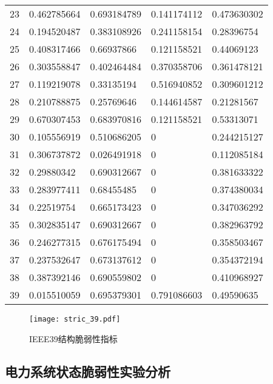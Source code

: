 \begin{table}[H]
\begin{tabular}{C{1.5cm}C{2.75cm}C{2.75cm}C{3.25cm}C{2.75cm}}
  23 & 0.462785664 & 0.693184789 & 0.141174112 & 0.473630302 \\ 
  24 & 0.194520487 & 0.383108926 & 0.241158154 & 0.28396754 \\ 
  25 & 0.408317466 & 0.66937866 & 0.121158521 & 0.44069123 \\ 
  26 & 0.303558847 & 0.402464484 & 0.370358706 & 0.361478121 \\ 
  27 & 0.119219078 & 0.33135194 & 0.516940852 & 0.309601212 \\ 
  28 & 0.210788875 & 0.25769646 & 0.144614587 & 0.21281567 \\ 
  29 & 0.670307453 & 0.683970816 & 0.121158521 & 0.53313071 \\ 
  30 & 0.105556919 & 0.510686205 & 0 & 0.244215127 \\ 
  31 & 0.306737872 & 0.026491918 & 0 & 0.112085184 \\ 
  32 & 0.29880342 & 0.690312667 & 0 & 0.381633322 \\ 
  33 & 0.283977411 & 0.68455485 & 0 & 0.374380034 \\ 
  34 & 0.22519754 & 0.665173423 & 0 & 0.347036292 \\ 
  35 & 0.302835147 & 0.690312667 & 0 & 0.382963792 \\ 
  36 & 0.246277315 & 0.676175494 & 0 & 0.358503467 \\ 
  37 & 0.237532647 & 0.673137612 & 0 & 0.354372194 \\ 
  38 & 0.387392146 & 0.690559802 & 0 & 0.410968927 \\ 
  39 & 0.015510059 & 0.695379301 & 0.791086603 & 0.49590635 \\ 
  \bottomrule
  \end{tabular}
\end{table}

\begin{figure}[H] %
  \centering
  \texttt{[image: stric\_39.pdf]}
  \caption{IEEE39结构脆弱性指标}
  \label{fig:stric_39}
\end{figure}


\subsection{电力系统状态脆弱性实验分析}
\label{sec:singleAnalysis_status}

